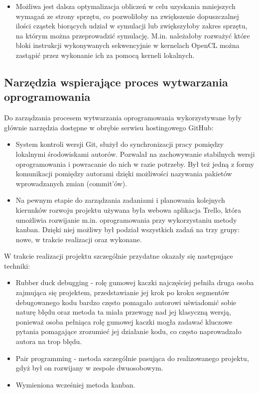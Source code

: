 \documentclass[polish, 12pt]{aghthesis}
\begin{document}
\begin{itemize}
			\item Możliwa jest dalsza optymalizacja obliczeń w celu uzyskania mniejszych wymagań ze strony sprzętu, co pozwoliłoby na zwiększenie dopuszczalnej ilości cząstek biorących udział w symulacji lub zwiększyłoby zakres sprzętu, na którym można przeprowadzić symulację. M.in. należałoby rozważyć które bloki instrukcji wykonywanych sekwencyjnie w kernelach OpenCL można zastąpić przez wykonanie ich za pomocą kerneli lokalnych.
		
		\end{itemize}
		
	\subsection{Narzędzia wspierające proces wytwarzania oprogramowania}
	
		Do zarządzania procesem wytwarzania oprogramowania wykorzystywane były głównie narzędzia dostępne w obrębie serwisu hostingowego GitHub:
		
		\begin{itemize}
		
			\item System kontroli wersji Git, służył do synchronizacji pracy pomiędzy lokalnymi środowiskami autorów. Pozwalał na zachowywanie stabilnych wersji oprogramowania i powracanie do nich w razie potrzeby. Był też jedną z formy komunikacji pomiędzy autorami dzięki możliwości nazywania pakietów wprowadzanych zmian (commit'ów).
			
			\item Na pewnym etapie do zarządzania zadaniami i planowania kolejnych kierunków rozwoju projektu używana była webowa aplikacja Trello, która umożliwia rozwijanie m.in. oprogramowania przy wykorzystaniu metody kanban. Dzięki niej możliwy był podział wszystkich zadań na trzy grupy: nowe, w trakcie realizacji oraz wykonane.
		
		\end{itemize}
		
		W trakcie realizacji projektu szczególnie przydatne okazały się następujące techniki:
		
		\begin{itemize}

			\item Rubber duck debugging - rolę gumowej kaczki najczęściej pełniła druga osoba zajmująca się projektem, przedstawianie jej krok po kroku segmentów debugowanego kodu bardzo często pomagało autorowi uświadomić sobie naturę błędu oraz metoda ta miała przewagę nad jej klasyczną wersją, ponieważ osoba pełniąca rolę gumowej kaczki mogła zadawać kluczowe pytania pomagające zrozumieć jej działanie kodu, co często naprowadzało autora na trop błędu.
			
			\item Pair programming - metoda szczególnie pasująca do realizowanego projektu, gdyż był on rozwijany w zespole dwuosobowym.
			
			\item Wymieniona wcześniej metoda kanban.
		
		\end{itemize}
		
\end{document}

